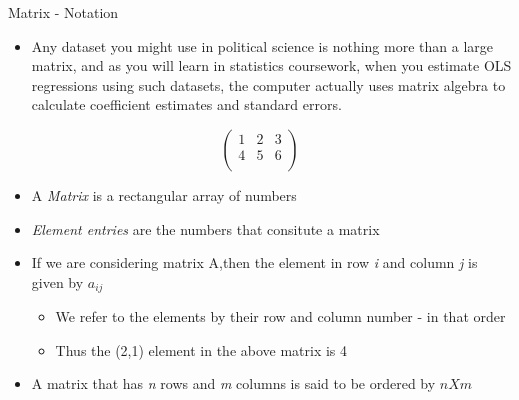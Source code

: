 \documentclass[
  ignorenonframetext,
]{beamer}
\providecommand{\tightlist}{%
  \setlength{\itemsep}{0pt}\setlength{\parskip}{0pt}}
\begin{document}
\begin{frame}{Matrix - Notation}
\protect\hypertarget{matrix---notation}{}

\begin{itemize}
\tightlist
\item
  Any dataset you might use in political science is nothing more than a
  large matrix, and as you will learn in statistics coursework, when you
  estimate OLS regressions using such datasets, the computer actually
  uses matrix algebra to calculate coefficient estimates and standard
  errors.
\end{itemize}

\[ \begin{pmatrix}
  1 & 2 &  3 \\
  4 & 5 &  6 \\
 \end{pmatrix}\]

\begin{itemize}
\item
  A \emph{Matrix} is a rectangular array of numbers
\item
  \emph{Element entries} are the numbers that consitute a matrix
\item
  If we are considering matrix A,then the element in row \emph{i} and
  column \emph{j} is given by \(a_{ij}\)

  \begin{itemize}
  \tightlist
  \item
    We refer to the elements by their row and column number - in that
    order
  \item
    Thus the (2,1) element in the above matrix is 4
  \end{itemize}
\item
  A matrix that has \emph{n} rows and \emph{m} columns is said to be
  ordered by \(n X m\)
\end{itemize}

\end{frame}
\end{document}
